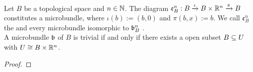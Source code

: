  \\
Let $B$ be a topological space and $n \in \mathbb{N}$.
The diagram $\mathfrak{e}^n_B: B \xrightarrow{\iota} B \times \mathbb{R}^n \xrightarrow{\pi} B{}$ constitutes a microbundle, where
$\iota(b) := (b, 0)$ and $\pi(b, x) := b$.
We call $\mathfrak{e}^n_B$ the  and every microbundle isomorphic to $\mathfrak{b}^n_B$ .
 \\
A microbundle $\mathfrak{b}$ of $B$ is trivial if and only if there exists a open subset $B \subseteq{} U$ with $U \cong B \times \mathbb{R}^n$.
\begin{proof}
\end{proof}